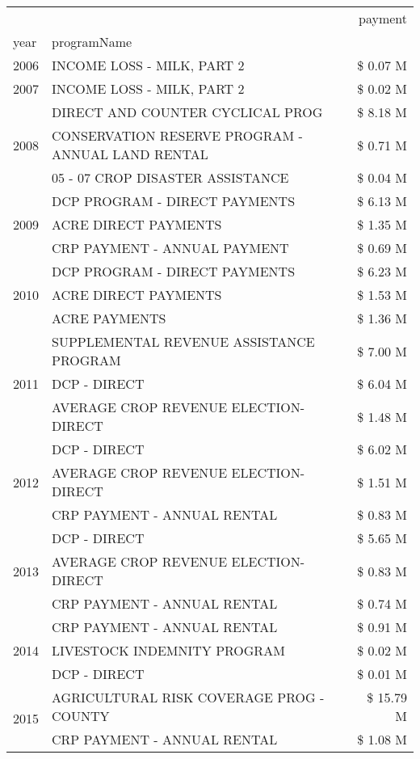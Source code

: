 \begin{tabular}{llr}
\toprule
 &  & payment \\
year & programName &  \\
\midrule
2006 & INCOME LOSS - MILK, PART 2 & \$ 0.07 M \\
\cline{1-3}
2007 & INCOME LOSS - MILK, PART 2 & \$ 0.02 M \\
\cline{1-3}
\multirow[t]{3}{*}{2008} & DIRECT AND COUNTER CYCLICAL PROG & \$ 8.18 M \\
 & CONSERVATION RESERVE PROGRAM - ANNUAL LAND RENTAL & \$ 0.71 M \\
 & 05 - 07 CROP DISASTER ASSISTANCE & \$ 0.04 M \\
\cline{1-3}
\multirow[t]{3}{*}{2009} & DCP PROGRAM - DIRECT PAYMENTS & \$ 6.13 M \\
 & ACRE DIRECT PAYMENTS & \$ 1.35 M \\
 & CRP PAYMENT - ANNUAL PAYMENT & \$ 0.69 M \\
\cline{1-3}
\multirow[t]{3}{*}{2010} & DCP PROGRAM - DIRECT PAYMENTS & \$ 6.23 M \\
 & ACRE DIRECT PAYMENTS & \$ 1.53 M \\
 & ACRE PAYMENTS & \$ 1.36 M \\
\cline{1-3}
\multirow[t]{3}{*}{2011} & SUPPLEMENTAL REVENUE ASSISTANCE PROGRAM & \$ 7.00 M \\
 & DCP - DIRECT & \$ 6.04 M \\
 & AVERAGE CROP REVENUE ELECTION-DIRECT & \$ 1.48 M \\
\cline{1-3}
\multirow[t]{3}{*}{2012} & DCP - DIRECT & \$ 6.02 M \\
 & AVERAGE CROP REVENUE ELECTION-DIRECT & \$ 1.51 M \\
 & CRP PAYMENT - ANNUAL RENTAL & \$ 0.83 M \\
\cline{1-3}
\multirow[t]{3}{*}{2013} & DCP - DIRECT & \$ 5.65 M \\
 & AVERAGE CROP REVENUE ELECTION-DIRECT & \$ 0.83 M \\
 & CRP PAYMENT - ANNUAL RENTAL & \$ 0.74 M \\
\cline{1-3}
\multirow[t]{3}{*}{2014} & CRP PAYMENT - ANNUAL RENTAL & \$ 0.91 M \\
 & LIVESTOCK INDEMNITY PROGRAM & \$ 0.02 M \\
 & DCP - DIRECT & \$ 0.01 M \\
\cline{1-3}
\multirow[t]{3}{*}{2015} & AGRICULTURAL RISK COVERAGE PROG - COUNTY & \$ 15.79 M \\
 & CRP PAYMENT - ANNUAL RENTAL & \$ 1.08 M \\

\end{tabular}
